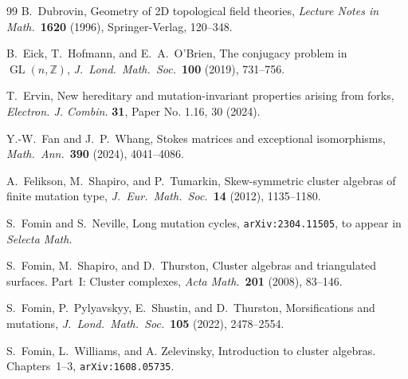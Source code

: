 \documentclass[11pt, letterpaper]{amsart}
\theoremstyle{definition}
\numberwithin{equation}{section}
\def\GL{{\operatorname{GL}}}
\begin{document}
\begin{thebibliography}{99}
B.~Dubrovin, 
Geometry of 2D topological field theories, 
\textsl{Lecture Notes in Math.}\ \textbf{1620} (1996), 
Springer-Verlag, 120--348.

B.~Eick, T.~Hofmann, and E.~A.~O'Brien, 
The conjugacy problem in $\GL(n,\mathbb{Z})$, 
\textsl{J.~Lond.\ Math.\ Soc.}\ \textbf{100} (2019), 731--756.


T.~Ervin, 
New hereditary and mutation-invariant properties arising from forks,
\textsl{Electron. J. Combin.} \textbf{31}, Paper No. 1.16, 30 (2024). 

Y.-W.~Fan and J.~P.~Whang,
Stokes matrices and exceptional isomorphisms,
\textsl{Math.\ Ann.}\ \textbf{390} (2024), 4041--4086.


A.~Felikson, M.~Shapiro, and P.~Tumarkin,
Skew-symmetric cluster algebras of finite mutation type,
\textsl{J.~Eur.\ Math.\ Soc.}\ \textbf{14} (2012), 1135--1180.


S.~Fomin and S.~Neville,
Long mutation cycles,
\texttt{arXiv:2304.11505},
to appear in \textsl{Selecta Math}. 

S.~Fomin, M.~Shapiro, and D.~Thurston, 
Cluster algebras and triangulated surfaces. Part~I: Cluster complexes,
\textsl{Acta Math.}\ \textbf{201} (2008), 83--146. 

S.~Fomin, P.~Pylyavskyy, E.~Shustin, and D.~Thurston,
Morsifications and mutations, 
\textsl{J.~Lond.\ Math.\ Soc.}\ \textbf{105} (2022), 2478--2554. 

S.~Fomin, L.~Williams, and A. Zelevinsky, 
Introduction to cluster algebras. Chapters~1--3,
\texttt{arXiv:1608.05735}. 




\end{thebibliography}
\end{document}
